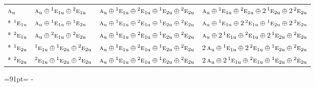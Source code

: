 \documentclass[10pt,a4paper]{article}
\newcommand{\needspace}[1]{\par\penalty-100\begingroup\dimen0=#1\relax\dimen2=\pagegoal
  \advance\dimen2-\pagetotal\ifdim\dimen0>\dimen2\relax\ifdim\dimen2>0pt\vfil\break\fi\fi
  \endgroup}
\numberwithin{equation}{section}
\newcommand{\irr}[1]{\text{\normalfont\scshape #1}}
\newcommand{\conjpair}[1]{{}^{#1}}
\newcommand{\ptag}[1]{\mathrm{#1}}
\begin{document}
{\begin{longtable}{@{}llll@{}}
$\irr{a}_{\ptag{u}}$ & $\irr{a}_{\ptag{u}}\oplus \conjpair{1}\irr{e}_{1\ptag{u}}\oplus \conjpair{2}\irr{e}_{1\ptag{u}}$ & $\irr{a}_{\ptag{u}}\oplus \conjpair{1}\irr{e}_{1\ptag{u}}\oplus \conjpair{2}\irr{e}_{1\ptag{u}}\oplus \conjpair{1}\irr{e}_{2\ptag{u}}\oplus \conjpair{2}\irr{e}_{2\ptag{u}}$ & $\irr{a}_{\ptag{u}}\oplus \conjpair{1}\irr{e}_{1\ptag{u}}\oplus \conjpair{2}\irr{e}_{1\ptag{u}}\oplus 2\,\conjpair{1}\irr{e}_{2\ptag{u}}\oplus 2\,\conjpair{2}\irr{e}_{2\ptag{u}}$\\*
$\conjpair{1}\irr{e}_{1\ptag{u}}$ & $\irr{a}_{\ptag{u}}\oplus \conjpair{1}\irr{e}_{1\ptag{u}}\oplus \conjpair{1}\irr{e}_{2\ptag{u}}$ & $\irr{a}_{\ptag{u}}\oplus \conjpair{1}\irr{e}_{1\ptag{u}}\oplus \conjpair{2}\irr{e}_{1\ptag{u}}\oplus \conjpair{1}\irr{e}_{2\ptag{u}}\oplus \conjpair{2}\irr{e}_{2\ptag{u}}$ & $\irr{a}_{\ptag{u}}\oplus \conjpair{1}\irr{e}_{1\ptag{u}}\oplus 2\,\conjpair{2}\irr{e}_{1\ptag{u}}\oplus \conjpair{1}\irr{e}_{2\ptag{u}}\oplus 2\,\conjpair{2}\irr{e}_{2\ptag{u}}$\\*
$\conjpair{2}\irr{e}_{1\ptag{u}}$ & $\irr{a}_{\ptag{u}}\oplus \conjpair{2}\irr{e}_{1\ptag{u}}\oplus \conjpair{2}\irr{e}_{2\ptag{u}}$ & $\irr{a}_{\ptag{u}}\oplus \conjpair{1}\irr{e}_{1\ptag{u}}\oplus \conjpair{2}\irr{e}_{1\ptag{u}}\oplus \conjpair{1}\irr{e}_{2\ptag{u}}\oplus \conjpair{2}\irr{e}_{2\ptag{u}}$ & $\irr{a}_{\ptag{u}}\oplus 2\,\conjpair{1}\irr{e}_{1\ptag{u}}\oplus \conjpair{2}\irr{e}_{1\ptag{u}}\oplus 2\,\conjpair{1}\irr{e}_{2\ptag{u}}\oplus \conjpair{2}\irr{e}_{2\ptag{u}}$\\*
$\conjpair{1}\irr{e}_{2\ptag{u}}$ & $\conjpair{1}\irr{e}_{1\ptag{u}}\oplus \conjpair{1}\irr{e}_{2\ptag{u}}\oplus \conjpair{2}\irr{e}_{2\ptag{u}}$ & $\irr{a}_{\ptag{u}}\oplus \conjpair{1}\irr{e}_{1\ptag{u}}\oplus \conjpair{2}\irr{e}_{1\ptag{u}}\oplus \conjpair{1}\irr{e}_{2\ptag{u}}\oplus \conjpair{2}\irr{e}_{2\ptag{u}}$ & $2\,\irr{a}_{\ptag{u}}\oplus \conjpair{1}\irr{e}_{1\ptag{u}}\oplus 2\,\conjpair{2}\irr{e}_{1\ptag{u}}\oplus \conjpair{1}\irr{e}_{2\ptag{u}}\oplus \conjpair{2}\irr{e}_{2\ptag{u}}$\\*
$\conjpair{2}\irr{e}_{2\ptag{u}}$ & $\conjpair{2}\irr{e}_{1\ptag{u}}\oplus \conjpair{1}\irr{e}_{2\ptag{u}}\oplus \conjpair{2}\irr{e}_{2\ptag{u}}$ & $\irr{a}_{\ptag{u}}\oplus \conjpair{1}\irr{e}_{1\ptag{u}}\oplus \conjpair{2}\irr{e}_{1\ptag{u}}\oplus \conjpair{1}\irr{e}_{2\ptag{u}}\oplus \conjpair{2}\irr{e}_{2\ptag{u}}$ & $2\,\irr{a}_{\ptag{u}}\oplus 2\,\conjpair{1}\irr{e}_{1\ptag{u}}\oplus \conjpair{2}\irr{e}_{1\ptag{u}}\oplus \conjpair{1}\irr{e}_{2\ptag{u}}\oplus \conjpair{2}\irr{e}_{2\ptag{u}}$\\
\bottomrule\end{longtable}}
\needspace{91pt}
\end{document}
